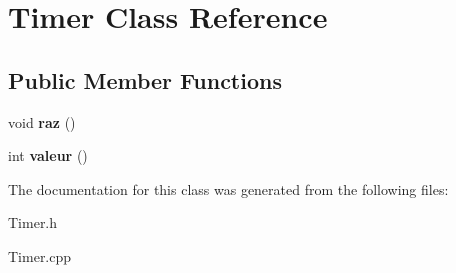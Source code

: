 \hypertarget{classTimer}{}\section{Timer Class Reference}
\label{classTimer}
\subsection*{Public Member Functions}
\begin{DoxyCompactItemize}
\item 
\mbox{\label{classTimer_a121b564c9c88f0189d1cd94a22d1f32f}} 
void {\bfseries raz} ()
\item 
\mbox{\label{classTimer_a35ee4bfcdd1626a40dd45e0167460dc2}} 
int {\bfseries valeur} ()
\end{DoxyCompactItemize}


The documentation for this class was generated from the following files\+:\begin{DoxyCompactItemize}
\item 
Timer.\+h\item 
Timer.\+cpp\end{DoxyCompactItemize}
